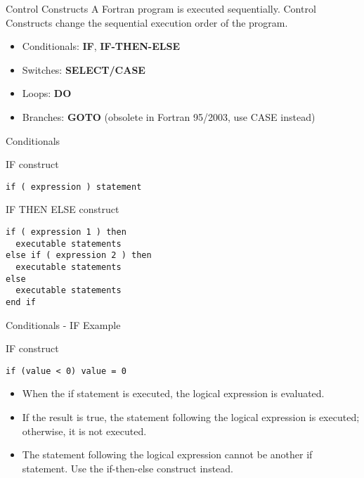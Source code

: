 \begin{frame}[fragile]{Control Constructs}
A Fortran program is executed sequentially. Control Constructs change the sequential execution order of the
program.
\begin{itemize}
 \item Conditionals: \textbf{IF}, \textbf{IF-THEN-ELSE}
 \item Switches: \textbf{SELECT/CASE} 
 \item Loops: \textbf{DO}
 \item Branches: \textbf{GOTO} (obsolete in Fortran 95/2003, use CASE instead)
\end{itemize}
\end{frame}

\begin{frame}[fragile]{Conditionals}
\begin{block}{IF construct}
\begin{lstlisting}
if ( expression ) statement
\end{lstlisting}
\end{block}
\begin{block}{IF THEN ELSE construct}
\begin{lstlisting}
if ( expression 1 ) then
  executable statements
else if ( expression 2 ) then
  executable statements
else
  executable statements
end if
\end{lstlisting}
\end{block}
\end{frame}

\begin{frame}[fragile]{Conditionals - IF Example}
\begin{block}{IF construct}
\begin{lstlisting}
if (value < 0) value = 0
\end{lstlisting}
\end{block}
\begin{itemize}
 \item When the if statement is executed, the logical expression is evaluated.
 \item If the result is true, the statement following the logical
expression is executed; otherwise, it is not executed.
 \item The statement following the logical expression cannot be
another if statement. Use the if-then-else construct instead.
\end{itemize}

\end{frame}

